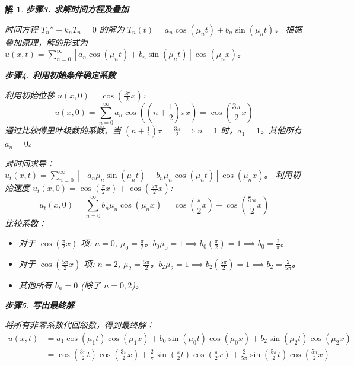 \documentclass[12pt,a4paper]{article}
\newtheorem*{solution}{解}
\begin{document}
\begin{solution}
	\hrulefill
	
	\textbf{步骤3. 求解时间方程及叠加}
	
	\noindent
	时间方程 $T_n'' + k_n T_n = 0$ 的解为 $T_n(t) = a_n \cos(\mu_n t) + b_n \sin(\mu_n t)$。
	根据叠加原理，解的形式为 $u(x,t) = \sum_{n=0}^\infty \left[a_n \cos(\mu_n t) + b_n \sin(\mu_n t)\right] \cos(\mu_n x)$。
	
	\hrulefill
	
	\textbf{步骤4. 利用初始条件确定系数}
	
	\noindent
	利用初始位移 $u(x,0) = \cos(\frac{3\pi}{2}x)$:
	\[ u(x,0) = \sum_{n=0}^\infty a_n \cos\left((n+\frac{1}{2})\pi x\right) = \cos\left(\frac{3\pi}{2}x\right) \]
	通过比较傅里叶级数的系数，当 $(n+\frac{1}{2})\pi = \frac{3\pi}{2} \implies n=1$ 时，$a_1=1$。其他所有 $a_n=0$。
	
	\noindent
	对时间求导：$u_t(x,t) = \sum_{n=0}^\infty \left[-a_n\mu_n \sin(\mu_n t) + b_n\mu_n \cos(\mu_n t)\right] \cos(\mu_n x)$。
	利用初始速度 $u_t(x,0) = \cos(\frac{\pi}{2}x) + \cos(\frac{5\pi}{2}x)$:
	\[ u_t(x,0) = \sum_{n=0}^\infty b_n\mu_n \cos(\mu_n x) = \cos\left(\frac{\pi}{2}x\right) + \cos\left(\frac{5\pi}{2}x\right) \]
	比较系数：
	\begin{itemize}
		\item 对于 $\cos(\frac{\pi}{2}x)$ 项: $n=0$, $\mu_0=\frac{\pi}{2}$。$b_0\mu_0 = 1 \implies b_0\left(\frac{\pi}{2}\right)=1 \implies b_0 = \frac{2}{\pi}$。
		\item 对于 $\cos(\frac{5\pi}{2}x)$ 项: $n=2$, $\mu_2=\frac{5\pi}{2}$。$b_2\mu_2 = 1 \implies b_2\left(\frac{5\pi}{2}\right)=1 \implies b_2 = \frac{2}{5\pi}$。
		\item 其他所有 $b_n=0$ (除了 $n=0,2$)。
	\end{itemize}
	
	\hrulefill
	
	\textbf{步骤5. 写出最终解}
	
	\noindent
	将所有非零系数代回级数，得到最终解：
	\begin{align*}
		u(x,t) &= a_1\cos(\mu_1 t)\cos(\mu_1 x) + b_0\sin(\mu_0 t)\cos(\mu_0 x) + b_2\sin(\mu_2 t)\cos(\mu_2 x) \\
		&= \cos\left(\frac{3\pi}{2}t\right)\cos\left(\frac{3\pi}{2}x\right) + \frac{2}{\pi}\sin\left(\frac{\pi}{2}t\right)\cos\left(\frac{\pi}{2}x\right) + \frac{2}{5\pi}\sin\left(\frac{5\pi}{2}t\right)\cos\left(\frac{5\pi}{2}x\right)
	\end{align*}
\end{solution}
	
	\newpage
\end{document}
